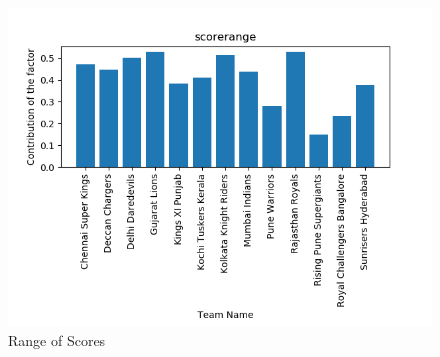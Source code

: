 \documentclass[sigconf]{acmart}
\begin{document}
\begin{figure}[!ht]
  \centering\includegraphics[width=\columnwidth]{images/scorerange.png}
  \caption{Range of Scores}\label{f:scorerange}
\end{figure}
\end{document}
